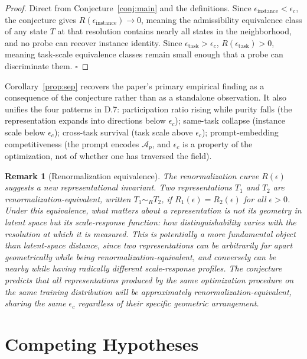 \documentclass[11pt]{article}
\newtheorem{remark}{Remark}
\begin{document}
\begin{proof}
Direct from Conjecture~\ref{conj:main} and the definitions. Since $\epsilon_{\mathrm{instance}} < \epsilon_c$,
the conjecture gives $R(\epsilon_{\mathrm{instance}}) \to 0$, meaning the admissibility equivalence class of
any state $T$ at that resolution contains nearly all states in the neighborhood, and no probe
can recover instance identity. Since $\epsilon_{\mathrm{task}} > \epsilon_c$,
$R(\epsilon_{\mathrm{task}}) > 0$, meaning task-scale equivalence classes remain small enough
that a probe can discriminate them. $\square$
\end{proof}

Corollary~\ref{prop:sep} recovers the paper's primary empirical finding as a consequence of
the conjecture rather than as a standalone observation. It also unifies the four patterns in D.7:
participation ratio rising while purity falls (the representation expands into directions below
$\epsilon_c$); same-task collapse (instance scale below $\epsilon_c$); cross-task survival (task
scale above $\epsilon_c$); prompt-embedding competitiveness (the prompt encodes $\mathcal{A}_p$,
and $\epsilon_c$ is a property of the optimization, not of whether one has traversed the field).

\begin{remark}[Renormalization equivalence]
The renormalization curve $R(\epsilon)$ suggests a new representational invariant. Two
representations $T_1$ and $T_2$ are renormalization-equivalent, written $T_1 \sim_R T_2$, if
$R_1(\epsilon) = R_2(\epsilon)$ for all $\epsilon > 0$. Under this equivalence, what matters
about a representation is not its geometry in latent space but its scale-response function: how
distinguishability varies with the resolution at which it is measured. This is potentially a
more fundamental object than latent-space distance, since two representations can be arbitrarily
far apart geometrically while being renormalization-equivalent, and conversely can be nearby
while having radically different scale-response profiles. The conjecture predicts that all
representations produced by the same optimization procedure on the same training distribution
will be approximately renormalization-equivalent, sharing the same $\epsilon_c$ regardless of
their specific geometric arrangement.
\end{remark}

\section{Competing Hypotheses}
\label{sec:hypo}
\end{document}
